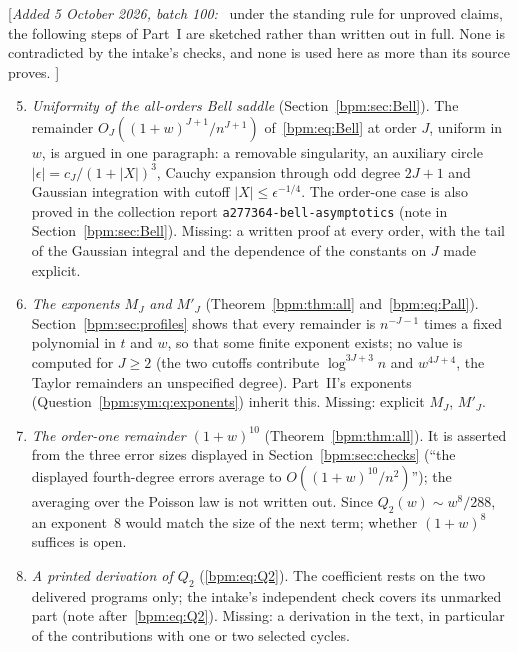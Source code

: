 \documentclass[11pt,a4paper]{article}
\theoremstyle{remark}\newtheorem{remark}[theorem]{Remark}%
\newenvironment{writenote}{\par\smallskip\noindent\small[\textit{Added 5 October 2026, batch 100:}\ }{]\par\smallskip}
\begin{document}
\begin{writenote}
under the standing rule for unproved claims, the following steps of
Part~I are sketched rather than written out in full. None is contradicted
by the intake's checks, and none is used here as more than its source
proves.
\end{writenote}
\begin{enumerate}\setcounter{enumi}{4}\renewcommand{\theenumi}{I.\arabic{enumi}}\renewcommand{\labelenumi}{\theenumi.}
\item\label{bpm:q:bellsaddle} \emph{Uniformity of the all-orders Bell
saddle} (Section~\ref{bpm:sec:Bell}). The remainder
$O_J((1+w)^{J+1}/n^{J+1})$ of~\eqref{bpm:eq:Bell} at order $J$, uniform in
$w$, is argued in one paragraph: a removable singularity, an auxiliary
circle $|\epsilon|=c_J/(1+|X|)^3$, Cauchy expansion through odd degree
$2J+1$ and Gaussian integration with cutoff $|X|\le\epsilon^{-1/4}$. The
order-one case is also proved in the collection report \nolinkurl{a277364-bell-asymptotics}
(note in Section~\ref{bpm:sec:Bell}). Missing: a written proof at every
order, with the tail of the Gaussian integral and the dependence of the
constants on $J$ made explicit.
\item\label{bpm:q:MJ} \emph{The exponents $M_J$ and $M'_J$}
(Theorem~\ref{bpm:thm:all} and~\eqref{bpm:eq:Pall}). Section~\ref{bpm:sec:profiles}
shows that every remainder is $n^{-J-1}$ times a fixed polynomial in $t$
and $w$, so that some finite exponent exists; no value is computed for
$J\ge2$ (the two cutoffs contribute $\log^{3J+3}n$ and $w^{4J+4}$, the
Taylor remainders an unspecified degree). Part~II's exponents
(Question~\ref{bpm:sym:q:exponents}) inherit this. Missing: explicit
$M_J$, $M'_J$.
\item\label{bpm:q:ten} \emph{The order-one remainder $(1+w)^{10}$}
(Theorem~\ref{bpm:thm:all}). It is asserted from the three error sizes
displayed in Section~\ref{bpm:sec:checks} (``the displayed fourth-degree
errors average to $O((1+w)^{10}/n^2)$''); the averaging over the Poisson
law is not written out. Since $Q_2(w)\sim w^8/288$, an exponent~$8$ would
match the size of the next term; whether $(1+w)^8$ suffices is open.
\item\label{bpm:q:Q2} \emph{A printed derivation of $Q_2$}
(\eqref{bpm:eq:Q2}). The coefficient rests on the two delivered programs
only; the intake's independent check covers its unmarked part
(note after~\eqref{bpm:eq:Q2}). Missing: a derivation in the text, in
particular of the contributions with one or two selected cycles.
\end{enumerate}
\end{document}

